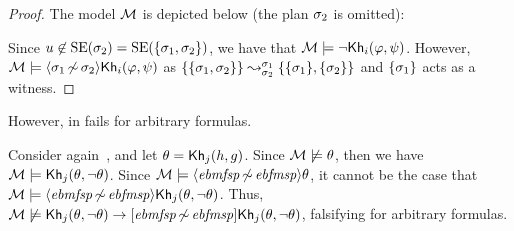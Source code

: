 \begin{proof}
The model $\modults$ is depicted below (the plan $\plan_2$ is omitted):

\begin{center}
\end{center}

Since $u \not\in \stexec(\plan_2) = \stexec(\set{\plan_1,\plan_2})$, we have that $\modults \models \neg\khi(\varphi,\psi)$.
However, $\modults \models \refdiam{\plan_1}{\plan_2}\khi(\varphi,\psi)$ as $\splitstr{\set{\set{\plan_1,\plan_2}}}{\set{\set{\plan_1},\set{\plan_2}}}{\plan_1}{\plan_2}$ and $\set{\plan_1}$ acts as a witness.
\end{proof}

However,  in  fails for arbitrary formulas.

\medskip

\begin{example}
Consider again~, and let $\theta = \kh_j(h,g)$. Since $\modults \not\models \theta$, then we have $\modults \models \kh_j(\theta,\neg \theta)$. Since $\modults\models\refdiam{\mathit{ebmfsp}}{\mathit{ebfmsp}}\theta$, it cannot be the case that  $\modults \models \refdiam{\mathit{ebmfsp}}{\mathit{ebfmsp}}\kh_j(\theta,\neg \theta)$. Thus, $\modults \not\models \kh_j(\theta,\neg \theta) \ra \refbox{\mathit{ebmfsp}}{\mathit{ebfmsp}}\kh_j(\theta,\neg \theta)$, falsifying  for arbitrary formulas.
\end{example}

\medskip

